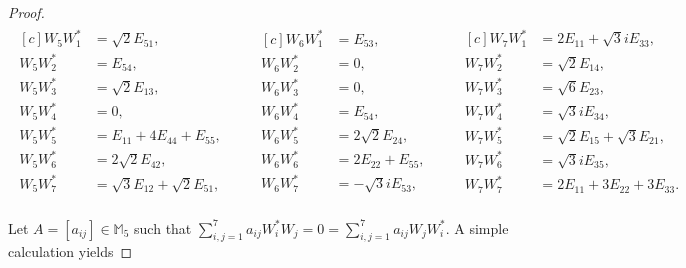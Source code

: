 \documentclass[10pt,reqno]{amsart}
\theoremstyle{definition}
\theoremstyle{plain}
\theoremstyle{remark}
\newcommand{\mbb}[1]{\mathbb{#1}}
\newcommand{\msc}[1]{\mathscr{#1}}
\newcommand{\M}[1]{\mbb{M}_{#1}}%
\numberwithin{equation}{section}%
\begin{document}
\begin{proof}
	
	\begin{align*}
		\begin{aligned}[c]
			W_5W_1^*&=\sqrt{2}E_{51},\\
			W_5W_2^*&=E_{54},\\
			W_5W_3^*&=\sqrt{2}E_{13},\\
			W_5W_4^*&=0,\\
			W_5W_5^*&=E_{11}+4E_{44}+E_{55},\\
			W_5W_6^*&=2\sqrt{2}E_{42},\\
			W_5W_7^*&=\sqrt{3}E_{12}+\sqrt{2}E_{51},\\
		\end{aligned}
		\qquad
		\begin{aligned}[c]
			W_6W_1^*&=E_{53},\\
			W_6W_2^*&=0,\\
			W_6W_3^*&=0,\\
			W_6W_4^*&=E_{54},\\
			W_6W_5^*&=2\sqrt{2}E_{24},\\
			W_6W_6^*&=2E_{22}+E_{55},\\
			W_6W_7^*&=-\sqrt{3}iE_{53},\\
		\end{aligned}
		\qquad
		\begin{aligned}[c]
			W_7W_1^*&=2E_{11}+\sqrt{3}iE_{33},\\
			W_7W_2^*&=\sqrt{2}E_{14},\\
			W_7W_3^*&=\sqrt{6}E_{23},\\
			W_7W_4^*&=\sqrt{3}iE_{34},\\
			W_7W_5^*&=\sqrt{2}E_{15}+\sqrt{3}E_{21},\\
			W_7W_6^*&=\sqrt{3}iE_{35},\\
			W_7W_7^*&=2E_{11}+3E_{22}+3E_{33}.\\
		\end{aligned}
	\end{align*}
	\normalsize
	
	
	Let $A=[a_{ij}]\in\M{5}$ such that $\sum_{i,j=1}^7a_{ij}W_i^*W_j=0=\sum_{i,j=1}^7a_{ij}W_jW_i^*$. A simple calculation yields
	

\end{proof}
\end{document}
